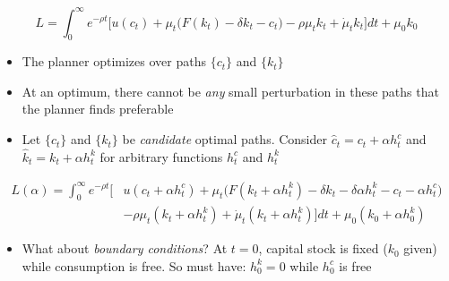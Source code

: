 \documentclass[10pt]{beamer}
\begin{document}
\begin{frame}{}
\begin{equation*}
	L = \int_0^\infty e^{-\rho t} \bigg[ u(c_t) + \mu_t \bigg( F(k_t) - \delta k_t - c_t \bigg) - \rho \mu_t k_t + \dot \mu_t k_t \bigg] dt + \mu_0 k_0
\end{equation*}

\begin{itemize}
\item The planner optimizes over paths $\{ c_t \}$ and $\{ k_t \}$

\item At an optimum, there cannot be \textit{any} small perturbation in these paths that the planner finds preferable

\item Let $\{ c_t \}$ and $\{ k_t \}$ be \textit{candidate} optimal paths. Consider $\hat c_t = c_t + \alpha h_t^c$ and $\hat k_t = k_t + \alpha h_t^k$ for arbitrary functions $h_t^c$ and $h_t^k$
\end{itemize}


\vspace{-2mm}
\begin{align*}
	L(\alpha) = \int_0^\infty e^{-\rho t} \bigg[ &u(c_t + \alpha h_t^c) + \mu_t \bigg( F(k_t + \alpha h_t^k) - \delta k_t - \delta \alpha h_t^k - c_t - \alpha h_t^c \bigg) \\
	&- \rho \mu_t (k_t + \alpha h_t^k) + \dot \mu_t (k_t + \alpha h_t^k) \bigg] dt + \mu_0 (k_0 + \alpha h_0^k)
\end{align*}

\vspace{-2mm}
\begin{itemize}
\item What about \textit{boundary conditions}? At $t=0$, capital stock is fixed ($k_0$ given) while consumption is free. So must have: $h_0^k = 0$ while $h_0^c$ is free
\end{itemize}
\end{frame}
\end{document}
